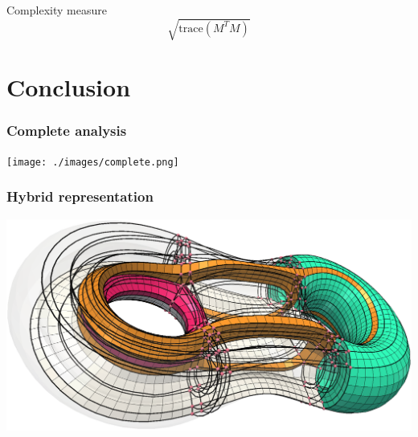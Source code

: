 \documentclass[12pt]{beamer}
\begin{document}
\begin{frame}
\begin{columns}
\begin{column}{0.5\textwidth}
    \end{column}
  \end{columns}
  \begin{block}{Complexity measure}\begin{equation*}
      \sqrt{\text{trace}(M^TM)}
  \end{equation*}\end{block}
\end{frame}

\section{Conclusion}

\begin{frame}
  \frametitle{Complete analysis}
  \texttt{[image: ./images/complete.png]}
\end{frame}

\begin{frame}
  \frametitle{Hybrid representation}
  \includegraphics[width=\textwidth]{./images/hybrid.png}
\end{frame}
\end{document}
